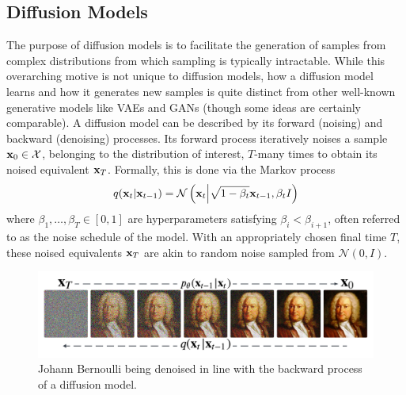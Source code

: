 \documentclass[11pt]{article}
\begin{document}
\subsection{Diffusion Models}
The purpose of diffusion models is to facilitate the generation of samples from complex distributions from which sampling is typically intractable. While this overarching motive is not unique to diffusion models, how a diffusion model learns and how it generates new samples is quite distinct from other well-known generative models like VAEs and GANs (though some ideas are certainly comparable). A diffusion model can be described by its forward (noising) and backward (denoising) processes. Its forward process iteratively noises a sample $\mathbf{x}_0\in\mathcal{X}$, belonging to the distribution of interest, $T$-many times to obtain its noised equivalent $\mathbf{x}_T$. Formally, this is done via the Markov process
$$
q(\mathbf{x}_t|\mathbf{x}_{t-1})
=
\mathcal{N}\left(\mathbf{x}_t\Big|\sqrt{1-\beta_t}\mathbf{x}_{t-1},\beta_tI\right)
$$
where $\beta_1,\dots,\beta_T\in[0,1]$ are hyperparameters satisfying $\beta_i<\beta_{i+1}$, often referred to as the noise schedule of the model. With an appropriately chosen final time $T$, these noised equivalents $\mathbf{x}_T$ are akin to random noise sampled from $\mathcal{N}(0,I)$.

\begin{figure}[t]
    \centering
    \includegraphics[width=\textwidth]{./figures/generative_models/diffusion_process.pdf}
    \caption{Johann Bernoulli being denoised in line with the backward process of a diffusion model.}
    \label{fig:diffusion_process}
\end{figure}
\end{document}
